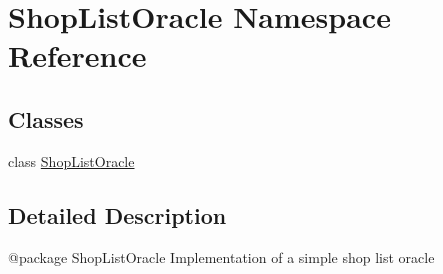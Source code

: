 \hypertarget{namespace_shop_list_oracle}{}\section{Shop\+List\+Oracle Namespace Reference}
\label{namespace_shop_list_oracle}
\subsection*{Classes}
\begin{DoxyCompactItemize}
\item 
class \mbox{\hyperlink{class_shop_list_oracle_1_1_shop_list_oracle}{Shop\+List\+Oracle}}
\end{DoxyCompactItemize}


\subsection{Detailed Description}
\begin{DoxyVerb}@package ShopListOracle
Implementation of a simple shop list oracle
\end{DoxyVerb}
 